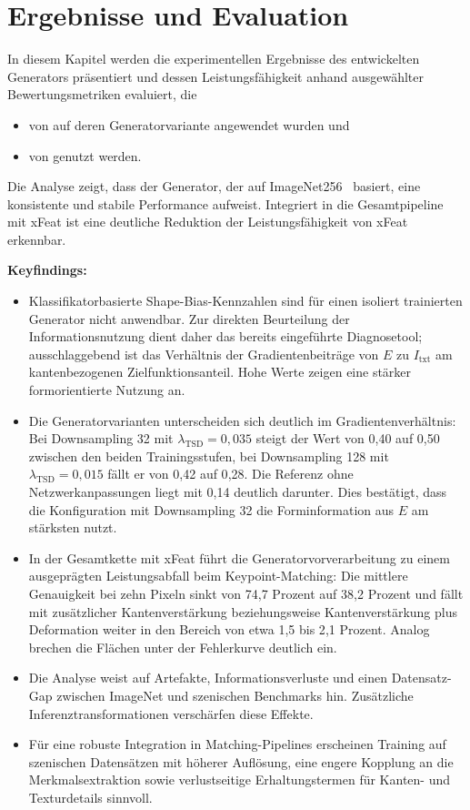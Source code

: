 \chapter{Ergebnisse und Evaluation}
\label{ch:Ergebnisse}

In diesem Kapitel werden die experimentellen Ergebnisse des entwickelten Generators präsentiert und dessen Leistungsfähigkeit anhand ausgewählter Bewertungsmetriken evaluiert, die
\begin{itemize}
    \item von \textcite{He_2023_ICCV} auf deren Generatorvariante angewendet wurden und
    \item von \textcite{potje2024xfeat} genutzt werden.
\end{itemize}
Die Analyse zeigt, dass der Generator, der auf ImageNet256~\cite{Uriot2023imageNet} basiert, eine konsistente und stabile Performance aufweist. Integriert in die Gesamtpipeline mit \ac{xFeat} ist eine deutliche Reduktion der Leistungsfähigkeit von \ac{xFeat} erkennbar.


\noindent\textbf{Keyfindings:}
\begin{itemize}
    \item Klassifikatorbasierte Shape-Bias-Kennzahlen sind für einen isoliert trainierten Generator nicht anwendbar. Zur direkten Beurteilung der Informationsnutzung dient daher das bereits eingeführte Diagnosetool; ausschlaggebend ist das Verhältnis der Gradientenbeiträge von $E$ zu $I_{\text{txt}}$ am kantenbezogenen Zielfunktionsanteil. Hohe Werte zeigen eine stärker formorientierte Nutzung an.
    \item Die Generatorvarianten unterscheiden sich deutlich im Gradientenverhältnis: Bei Downsampling 32 mit $\lambda_{\text{TSD}}=0{,}035$ steigt der Wert von 0{,}40 auf 0{,}50 zwischen den beiden Trainingsstufen, bei Downsampling 128 mit $\lambda_{\text{TSD}}=0{,}015$ fällt er von 0{,}42 auf 0{,}28. Die Referenz ohne Netzwerkanpassungen liegt mit 0{,}14 deutlich darunter. Dies bestätigt, dass die Konfiguration mit Downsampling 32 die Forminformation aus $E$ am stärksten nutzt.
    \item In der Gesamtkette mit \ac{xFeat} führt die Generatorvorverarbeitung zu einem ausgeprägten Leistungsabfall beim Keypoint-Matching: Die mittlere Genauigkeit bei zehn Pixeln sinkt von 74{,}7 Prozent auf 38{,}2 Prozent und fällt mit zusätzlicher Kantenverstärkung beziehungsweise Kantenverstärkung plus Deformation weiter in den Bereich von etwa 1{,}5 bis 2{,}1 Prozent. Analog brechen die Flächen unter der Fehlerkurve deutlich ein.
    \item Die Analyse weist auf Artefakte, Informationsverluste und einen Datensatz-Gap zwischen ImageNet und szenischen Benchmarks hin. Zusätzliche Inferenztransformationen verschärfen diese Effekte.
    \item Für eine robuste Integration in Matching-Pipelines erscheinen Training auf szenischen Datensätzen mit höherer Auflösung, eine engere Kopplung an die Merkmalsextraktion sowie verlustseitige Erhaltungstermen für Kanten- und Texturdetails sinnvoll.
\end{itemize}



